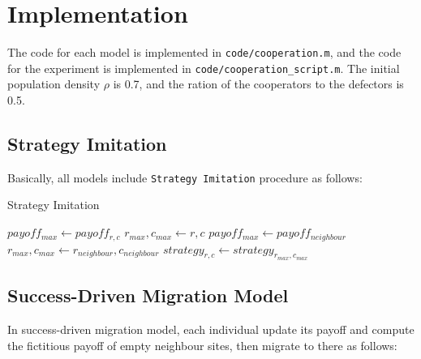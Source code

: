 \documentclass[11pt]{article}
\begin{document}
\section{Implementation}
The code for each model is implemented in \verb|code/cooperation.m|, and the code for the experiment is implemented in \verb|code/cooperation_script.m|. The initial population density $\rho$ is 0.7, and the ration of the cooperators to the defectors is 0.5.

\subsection{Strategy Imitation}
Basically, all models include \verb|Strategy Imitation| procedure as follows:

\begin{algorithm}[H]
  \caption{Strategy Imitation}\label{imitation}
  \begin{algorithmic}[1]
      \State $payoff_{max} \gets payoff_{r,c}$
      \State $r_{max},c_{max} \gets r,c$
        \State $payoff_{max} \gets payoff_{neighbour}$
        \State $r_{max},c_{max} \gets r_{neighbour},c_{neighbour}$
        \EndIf
      \EndFor
      \State $strategy_{r,c} \gets strategy_{r_{max},c_{max}}$   
    \EndProcedure
  \end{algorithmic}
\end{algorithm}


\subsection{Success-Driven Migration Model}
In success-driven migration model, each individual update its payoff and compute the fictitious payoff of empty neighbour sites, then migrate to there as follows:
\end{document}
